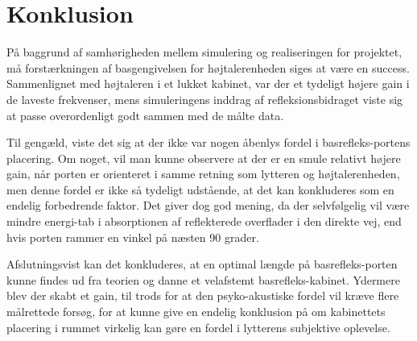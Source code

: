 \chapter{Konklusion}

På baggrund af samhørigheden mellem simulering og realiseringen for projektet, må forstærkningen af basgengivelsen for højtalerenheden siges at være en success. 
Sammenlignet med højtaleren i et lukket kabinet, var der et tydeligt højere gain i de laveste frekvenser, mens simuleringens inddrag af refleksionsbidraget viste sig at passe overordenligt godt sammen med de målte data. 

Til gengæld, viste det sig at der ikke var nogen åbenlys fordel i basrefleks-portens placering. Om noget, vil man kunne observere at der er en smule relativt højere gain, når porten er orienteret i samme retning som lytteren og højtalerenheden, men denne fordel er ikke så tydeligt udstående, at det kan konkluderes som en endelig forbedrende faktor.
Det giver dog god mening, da der selvfølgelig vil være mindre energi-tab i absorptionen af reflekterede overflader i den direkte vej, end hvis porten rammer en vinkel på næsten 90 grader. 

Afslutningsvist kan det konkluderes, at en optimal længde på basrefleks-porten kunne findes ud fra teorien og danne et velafstemt basrefleks-kabinet. Ydermere blev der skabt et gain, til trods for at den psyko-akustiske fordel vil kræve flere målrettede forsøg, for at kunne give en endelig konklusion på om kabinettets placering i rummet virkelig kan gøre en fordel i lytterens subjektive oplevelse. 

